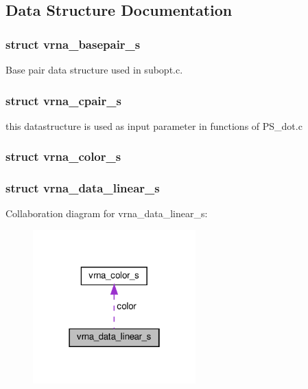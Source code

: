 \subsection{Data Structure Documentation}
\label{structvrna__basepair__s}
\subsubsection{struct vrna\+\_\+basepair\+\_\+s}
Base pair data structure used in subopt.\+c. \label{structvrna__cpair__s}
\subsubsection{struct vrna\+\_\+cpair\+\_\+s}
this datastructure is used as input parameter in functions of P\+S\+\_\+dot.\+c \label{structvrna__color__s}
\subsubsection{struct vrna\+\_\+color\+\_\+s}
\label{structvrna__data__linear__s}
\subsubsection{struct vrna\+\_\+data\+\_\+linear\+\_\+s}


Collaboration diagram for vrna\+\_\+data\+\_\+linear\+\_\+s\+:
\nopagebreak
\begin{figure}[H]
\begin{center}
\leavevmode
\includegraphics[width=178pt]{structvrna__data__linear__s__coll__graph}
\end{center}
\end{figure}
\label{structvrna__sect__s}
